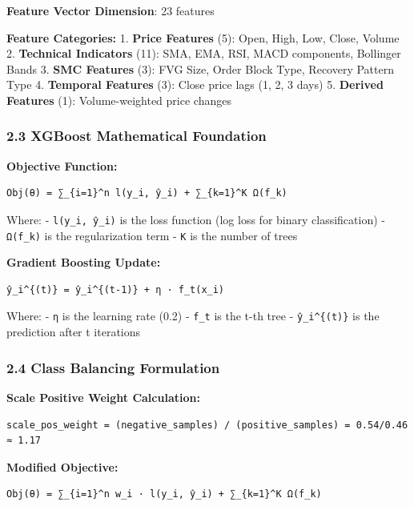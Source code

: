 \textbf{Feature Vector Dimension}: 23 features

\textbf{Feature Categories:} 1. \textbf{Price Features} (5): Open, High,
Low, Close, Volume 2. \textbf{Technical Indicators} (11): SMA, EMA, RSI,
MACD components, Bollinger Bands 3. \textbf{SMC Features} (3): FVG Size,
Order Block Type, Recovery Pattern Type 4. \textbf{Temporal Features}
(3): Close price lags (1, 2, 3 days) 5. \textbf{Derived Features} (1):
Volume-weighted price changes

\subsubsection{2.3 XGBoost Mathematical
Foundation}\label{xgboost-mathematical-foundation}

\textbf{Objective Function:}

\begin{verbatim}
Obj(θ) = ∑_{i=1}^n l(y_i, ŷ_i) + ∑_{k=1}^K Ω(f_k)
\end{verbatim}

Where: - \texttt{l(y\_i,\ ŷ\_i)} is the loss function (log loss for
binary classification) - \texttt{Ω(f\_k)} is the regularization term -
\texttt{K} is the number of trees

\textbf{Gradient Boosting Update:}

\begin{verbatim}
ŷ_i^{(t)} = ŷ_i^{(t-1)} + η · f_t(x_i)
\end{verbatim}

Where: - \texttt{η} is the learning rate (0.2) - \texttt{f\_t} is the
t-th tree - \texttt{ŷ\_i\^{}\{(t)\}} is the prediction after t
iterations

\subsubsection{2.4 Class Balancing
Formulation}\label{class-balancing-formulation}

\textbf{Scale Positive Weight Calculation:}

\begin{verbatim}
scale_pos_weight = (negative_samples) / (positive_samples) = 0.54/0.46 ≈ 1.17
\end{verbatim}

\textbf{Modified Objective:}

\begin{verbatim}
Obj(θ) = ∑_{i=1}^n w_i · l(y_i, ŷ_i) + ∑_{k=1}^K Ω(f_k)
\end{verbatim}


